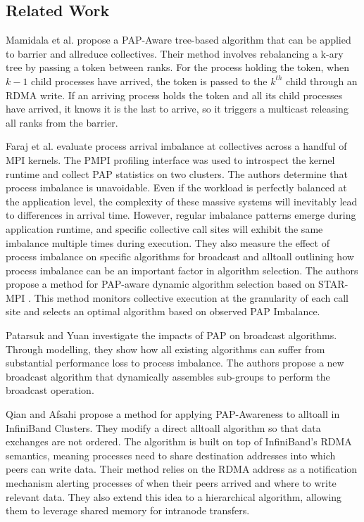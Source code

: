 \subsection{Related Work}
Mamidala et al. \cite{Mamidala2004BarrierAllreduceIBAdaptive} propose a \gls{PAP}-Aware tree-based algorithm that can be applied to barrier and allreduce collectives.
Their method involves rebalancing a k-ary tree by passing a token between ranks.
For the process holding the token, when $k-1$ child processes have arrived, the token is passed to the $k^{th}$ child through an \gls{RDMA} write.
If an arriving process holds the token and all its child processes have arrived, it knows it is the last to arrive, so it triggers a multicast releasing all ranks from the barrier. 

Faraj et al. \cite{Faraj2008StudyProcArrivalMPIColl} evaluate process arrival imbalance at collectives across a handful of \gls{MPI} kernels.
The PMPI profiling interface was used to introspect the kernel runtime and collect \gls{PAP} statistics on two clusters.
The authors determine that process imbalance is unavoidable.
Even if the workload is perfectly balanced at the application level, the complexity of these massive systems will inevitably lead to differences in arrival time. 
However, regular imbalance patterns emerge during application runtime, and specific collective call sites will exhibit the same imbalance multiple times during execution.
They also measure the effect of process imbalance on specific algorithms for broadcast and alltoall outlining how process imbalance can be an important factor in algorithm selection.
The authors propose a method for \gls{PAP}-aware dynamic algorithm selection based on STAR-MPI \cite{Faraj2006StarMPI}.
This method monitors collective execution at the granularity of each call site and selects an optimal algorithm based on observed \gls{PAP} Imbalance. 

Patarsuk and Yuan \cite{Patarasuk2008EffBcastDifProcArr} investigate the impacts of \gls{PAP} on broadcast algorithms.
Through modelling, they show how all existing algorithms can suffer from substantial performance loss to process imbalance. 
The authors propose a new broadcast algorithm that dynamically assembles sub-groups to perform the broadcast operation.

Qian and Afsahi \cite{Qian2009ProcArrivalSHMA2AIB} propose a method for applying \gls{PAP}-Awareness to alltoall in InfiniBand Clusters.
They modify a direct alltoall algorithm so that data exchanges are not ordered.
The algorithm is built on top of InfiniBand's \gls{RDMA} semantics, meaning processes need to share destination addresses into which peers can write data. 
Their method relies on the \gls{RDMA} address as a notification mechanism alerting processes of when their peers arrived and where to write relevant data.
They also extend this idea to a hierarchical algorithm, allowing them to leverage shared memory for intranode transfers.

